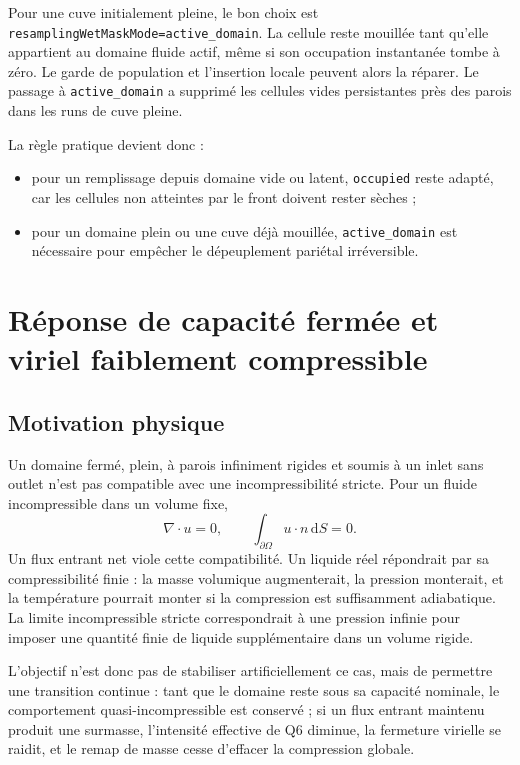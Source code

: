 \documentclass[11pt,a4paper]{article}
\begin{document}
Pour une cuve initialement pleine, le bon choix est \texttt{resamplingWetMaskMode=active\_domain}. La cellule reste mouillée tant qu'elle appartient au domaine fluide actif, même si son occupation instantanée tombe à zéro. Le garde de population et l'insertion locale peuvent alors la réparer. Le passage à \texttt{active\_domain} a supprimé les cellules vides persistantes près des parois dans les runs de cuve pleine.

La règle pratique devient donc :
\begin{itemize}
  \item pour un remplissage depuis domaine vide ou latent, \texttt{occupied} reste adapté, car les cellules non atteintes par le front doivent rester sèches ;
  \item pour un domaine plein ou une cuve déjà mouillée, \texttt{active\_domain} est nécessaire pour empêcher le dépeuplement pariétal irréversible.
\end{itemize}

\section{Réponse de capacité fermée et viriel faiblement compressible}

\subsection{Motivation physique}

Un domaine fermé, plein, à parois infiniment rigides et soumis à un inlet sans outlet n'est pas compatible avec une incompressibilité stricte. Pour un fluide incompressible dans un volume fixe,
\begin{equation}
  \nabla\cdot u = 0,
  \qquad
  \int_{\partial\Omega} u\cdot n\,\mathrm{d}S = 0.
\end{equation}
Un flux entrant net viole cette compatibilité. Un liquide réel répondrait par sa compressibilité finie : la masse volumique augmenterait, la pression monterait, et la température pourrait monter si la compression est suffisamment adiabatique. La limite incompressible stricte correspondrait à une pression infinie pour imposer une quantité finie de liquide supplémentaire dans un volume rigide.

L'objectif n'est donc pas de stabiliser artificiellement ce cas, mais de permettre une transition continue : tant que le domaine reste sous sa capacité nominale, le comportement quasi-incompressible est conservé ; si un flux entrant maintenu produit une surmasse, l'intensité effective de Q6 diminue, la fermeture virielle se raidit, et le remap de masse cesse d'effacer la compression globale.
\end{document}
